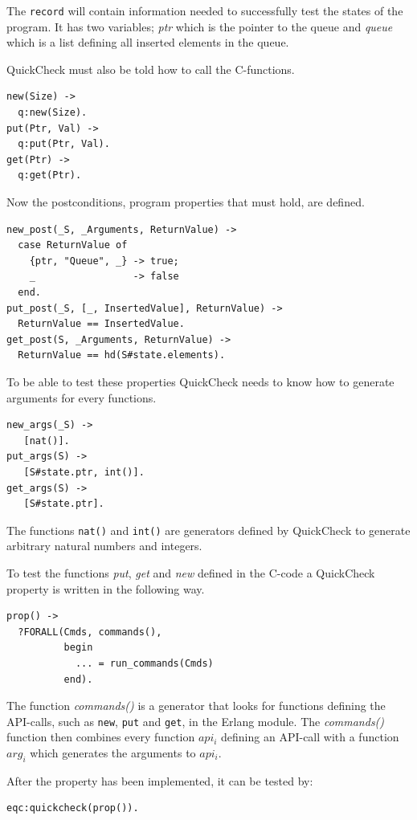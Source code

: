 The \lstinline!record! will contain information needed to successfully
test the states of the program. It has two variables;
\emph{ptr} which is the pointer to the queue and
\emph{queue} which is a list defining all inserted elements in the queue.

QuickCheck must also be told how to call the C-functions.
\begin{lstlisting}
new(Size) ->
  q:new(Size).
put(Ptr, Val) ->
  q:put(Ptr, Val).
get(Ptr) ->
  q:get(Ptr).
\end{lstlisting}

Now the postconditions, program properties that must hold, are defined.
\begin{lstlisting}
new_post(_S, _Arguments, ReturnValue) ->
  case ReturnValue of
    {ptr, "Queue", _} -> true;
    _                 -> false
  end.
put_post(_S, [_, InsertedValue], ReturnValue) ->
  ReturnValue == InsertedValue.
get_post(S, _Arguments, ReturnValue) ->
  ReturnValue == hd(S#state.elements).
\end{lstlisting}

To be able to test these properties QuickCheck needs to know how to generate
arguments for every functions.
\begin{lstlisting}
new_args(_S) ->
   [nat()].
put_args(S) ->
   [S#state.ptr, int()].
get_args(S) ->
   [S#state.ptr].
\end{lstlisting}
The functions \lstinline!nat()! and \lstinline!int()! are generators
defined by QuickCheck to generate arbitrary natural numbers and integers.

To test the functions \emph{put}, \emph{get} and \emph{new} defined in the C-code a QuickCheck
property is written in the following way.  \lstset{style=erlang}
\begin{lstlisting}
prop() ->
  ?FORALL(Cmds, commands(),
          begin
            ... = run_commands(Cmds)
          end).
\end{lstlisting}

The function \emph{commands()} is a generator that looks
for functions defining the API-calls, such as \lstinline!new!, \lstinline!put! and
\lstinline!get!, in the Erlang module. The \emph{commands()} function then combines
every function $api_i$ defining an API-call with a function $arg_i$ which
generates the arguments to $api_i$.

After the property has been implemented, it can be tested by:

\begin{lstlisting}
eqc:quickcheck(prop()).
\end{lstlisting}

